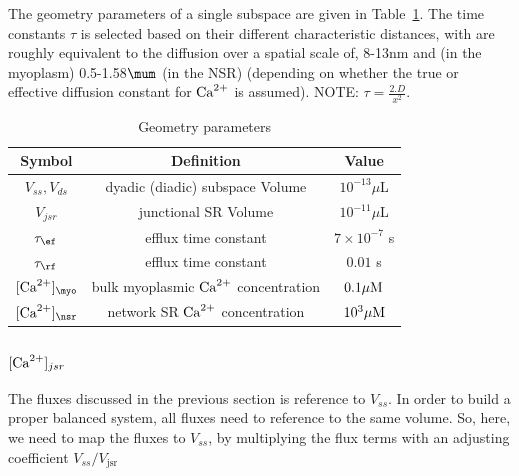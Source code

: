 
The geometry parameters of a single subspace are given in
Table~\ref{tab:Geometry_param}. The time constants $\tau$ is selected based on
their different characteristic distances, with are roughly equivalent to the diffusion
over a spatial scale of, 8-13nm and (in the myoplasm) 0.5-1.58$\mum$ (in the
NSR) (depending on whether the true or effective diffusion constant for
${\text{Ca}^{2+}}$ is assumed). NOTE: $\tau=\frac{2.D}{x^2}$.

\begin{table}[hbt]
  \begin{center}
    \caption{Geometry parameters}
    \begin{tabular}{ccc} 
      \hline
      Symbol & Definition & Value \\ 
      \hline\hline
      $V_{ss}, V_{ds}$ & dyadic (diadic) subspace Volume & $10^{-13}\mu$L \\
      $V_{jsr}$ & junctional SR Volume & $10^{-11}\mu$L \\
      $\tau_\ef$ & efflux time constant & $7\times 10^{-7}$ s \\
      $\tau_\rf$ & efflux time constant & $0.01$ s \\
      $[\Ca]_\myo$ & bulk myoplasmic ${\text{Ca}^{2+}}$ concentration & $0.1{\mu\text{M}}$ \\
      $[\Ca]_\nsr$ & network SR ${\text{Ca}^{2+}}$ concentration & $10^3{\mu\text{M}}$ \\
    \end{tabular}
  \end{center}
  \label{tab:Geometry_param}
\end{table}

\subsubsection{$[{\text{Ca}^{2+}}]_{jsr}$}
\label{sec:calcium_jsr}

\begin{framed}
  The fluxes discussed in the previous section is reference to
  $V_{ss}$. In order to build a proper balanced system, all fluxes
  need to reference to the same volume. So, here, we need to map the
  fluxes to $V_{ss}$, by multiplying the flux terms with an adjusting
  coefficient $V_{ss}/V_\text{jsr}$
\end{framed}

